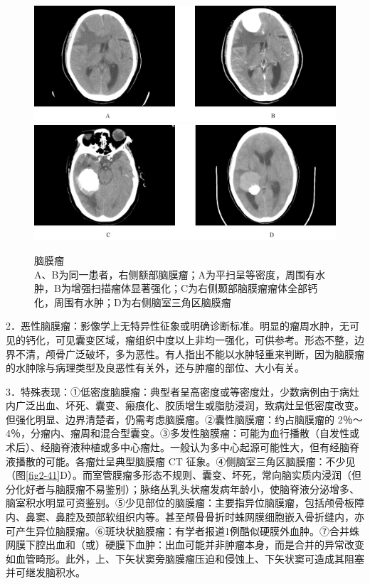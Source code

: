 \begin{figure}[!htbp]
 \centering
 \includegraphics[width=.7\textwidth,height=\textheight,keepaspectratio]{./images/Image00070.jpg}
 \includegraphics[width=.7\textwidth,height=\textheight,keepaspectratio]{./images/Image00071.jpg}
 \captionsetup{justification=centering}
 \caption{脑膜瘤\\{\small A、B为同一患者，右侧额部脑膜瘤；A为平扫呈等密度，周围有水肿，B为增强扫描瘤体显著强化；C为右侧颞部脑膜瘤瘤体全部钙化，周围有水肿；D为右侧脑室三角区脑膜瘤}}
 \label{fig2-42}
  \end{figure} 

2．恶性脑膜瘤：影像学上无特异性征象或明确诊断标准。明显的瘤周水肿，无可见的钙化，可见囊变区域，瘤组织中度以上非均一强化，可供参考。形态不整，边界不清，颅骨广泛破坏，多为恶性。有人指出不能以水肿轻重来判断，因为脑膜瘤的水肿除与病理类型及良恶性有关外，还与肿瘤的部位、大小有关。

3．特殊表现：①低密度脑膜瘤：典型者呈高密度或等密度灶，少数病例由于病灶内广泛出血、坏死、囊变、瘢痕化、胶质增生或脂肪浸润，致病灶呈低密度改变。但强化明显、边界清楚者，仍需考虑脑膜瘤。②囊性脑膜瘤：约占脑膜瘤的
2％～4％，分瘤内、瘤周和混合型囊变。③多发性脑膜瘤：可能为血行播散（自发性或术后）、经脑脊液种植或多中心瘤灶。一般认为多中心起源可能性大，但有经脑脊液播散的可能。各瘤灶呈典型脑膜瘤
CT
征象。④侧脑室三角区脑膜瘤：不少见（图\ref{fig2-41}D）。而室管膜瘤多形态不规则、囊变、坏死，常向脑实质内浸润（但分化好者与脑膜瘤不易鉴别）；脉络丛乳头状瘤发病年龄小，使脑脊液分泌增多、脑室积水明显可资鉴别。⑤少见部位的脑膜瘤：主要指异位脑膜瘤，包括颅骨板障内、鼻窦、鼻腔及颈部软组织内等。甚至颅骨骨折时蛛网膜细胞嵌入骨折缝内，亦可产生异位脑膜瘤。⑥斑块状脑膜瘤：有学者报道1例酷似硬膜外血肿。⑦合并蛛网膜下腔出血和（或）硬膜下血肿：出血可能并非肿瘤本身，而是合并的异常改变如血管畸形。此外，上、下矢状窦旁脑膜瘤压迫和侵蚀上、下矢状窦可造成其阻塞并可继发脑积水。


